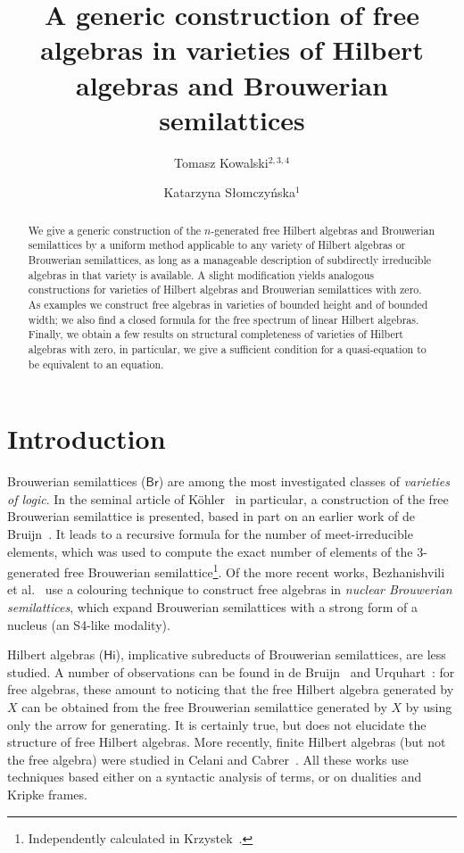 \documentclass{amsart}
\title[Free Hilbert algebras]{A generic construction of free algebras
in varieties of Hilbert algebras and Brouwerian semilattices}
\author[Kowalski]{Tomasz Kowalski$^{2,3,4}$}
\author[Słomczyńska]{Katarzyna Słomczyńska$^{1}$}
\begin{document}
\maketitle

\begin{abstract}
We give a generic construction of the $n$-generated free Hilbert algebras and
Brouwerian semilattices by a uniform
method applicable to any variety of Hilbert algebras or Brouwerian
semilattices, as long as a manageable description of subdirectly irreducible
algebras in that variety is available.
A slight modification yields analogous constructions for varieties of Hilbert
algebras and Brouwerian semilattices with zero. As examples we construct free
algebras in varieties of bounded height and of bounded width; we also find a
closed formula for the free spectrum of linear Hilbert algebras. Finally, we 
obtain a few results on structural completeness of varieties of Hilbert algebras
with zero, in particular, we give a sufficient condition for a quasi-equation to
be equivalent to an equation.  
\end{abstract}  



\section{Introduction}\label{sec:intro}


Brouwerian semilattices ($\mathsf{Br}$) are among the most investigated classes
of \emph{varieties of   logic}. In the seminal article of K\"ohler~\cite{Koh81}
in particular, a construction of the free 
Brouwerian semilattice is presented, based in part on an earlier
work of de Bruijn~\cite{deB75}. It leads to a recursive formula for the number
of meet-irreducible elements, which was used to compute the exact number
of elements of the 3-generated free Brouwerian semilattice\footnote{Independently
  calculated in Krzystek~\cite{Krz77}.}. 
Of the more recent works, Bezhanishvili et al.~\cite{BBCGGJ21}
use a colouring technique to construct free algebras in \emph{nuclear Brouwerian
  semilattices}, which expand Brouwerian semilattices with a strong form of a
nucleus (an S4-like modality).

Hilbert algebras ($\mathsf{Hi}$), implicative
subreducts of Brouwerian semilattices, are less studied. A number of
observations can be found in de Bruijn~\cite{deB75} and
Urquhart~\cite{Urq74}: for free algebras, these amount to noticing that the
free Hilbert algebra generated by $X$ can be obtained from the free Brouwerian
semilattice generated by $X$ by using only the arrow for generating.
It is certainly true, but does not elucidate the structure of free Hilbert
algebras. More recently, finite Hilbert algebras (but
not the free algebra) were 
studied in Celani and Cabrer~\cite{CC05}.
All these works use techniques based either on a syntactic analysis of terms,
or on dualities and Kripke frames.
\end{document}
